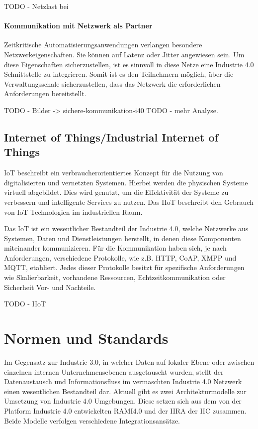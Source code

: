 TODO - Netzlast bei 

\paragraph{Kommunikation mit Netzwerk als Partner}
Zeitkritische Automatisierungsanwendungen verlangen besondere Netzwerkeigenschaften. Sie können auf Latenz oder Jitter angewiesen sein. Um diese Eigenschaften sicherzustellen, ist es sinnvoll in diese Netze eine Industrie 4.0 Schnittstelle zu integrieren. Somit ist es den Teilnehmern möglich, über die Verwaltungsschale sicherzustellen, dass das Netzwerk die erforderlichen Anforderungen bereitstellt. \cite{sichKom2017}

TODO - Bilder -> sichere-kommunikation-i40
TODO - mehr Analyse.

\subsection{Internet of Things/Industrial Internet of Things}
\label{Grundlagen:IoT/IIoT}
\ac{IoT} beschreibt ein verbraucherorientiertes Konzept für die Nutzung von digitalisierten und vernetzten Systemen. Hierbei werden die physischen Systeme virtuell abgebildet. Dies wird genutzt, um die Effektivität der Systeme zu verbessern und intelligente Services zu nutzen. Das \ac{IIoT} beschreibt den Gebrauch von \ac{IoT}-Technologien im industriellen Raum.

Das \ac{IoT} ist ein wesentlicher Bestandteil der Industrie 4.0, welche Netzwerke aus Systemen, Daten und Dienstleistungen herstellt, in denen diese Komponenten miteinander kommunizieren. Für die Kommunikation haben sich, je nach Anforderungen, verschiedene Protokolle, wie z.B. \ac{HTTP}, \ac{CoAP}, \ac{XMPP} und \ac{MQTT}, etabliert. Jedes dieser Protokolle besitzt für spezifische Anforderungen wie Skalierbarkeit, vorhandene Ressourcen, Echtzeitkommunikation oder Sicherheit Vor- und Nachteile. 

TODO - \ac{IIoT}

\section{Normen und Standards}
\label{Grundlagen:Normen und Standards}
Im Gegensatz zur Industrie 3.0, in welcher Daten auf lokaler Ebene oder zwischen einzelnen internen Unternehmensebenen ausgetauscht wurden, stellt der Datenaustausch und Informationsfluss im vermaschten Industrie 4.0 Netzwerk einen wesentlichen Bestandteil dar. Aktuell gibt es zwei Architekturmodelle zur Umsetzung von Industrie 4.0 Umgebungen. Diese setzen sich aus dem von der Platform Industrie 4.0 entwickelten \ac{RAMI4.0} und der \ac{IIRA} der \ac{IIC} zusammen. Beide Modelle verfolgen verschiedene Integrationsansätze.

